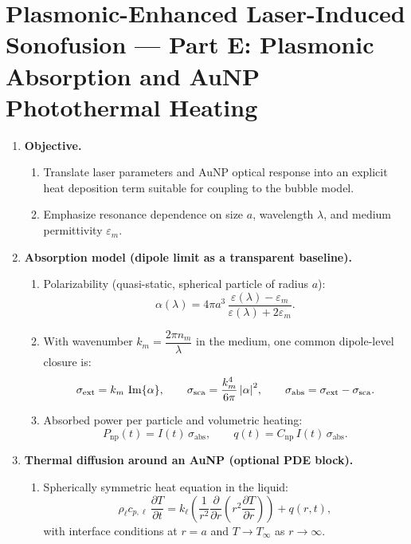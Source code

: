 \documentclass[11pt]{article}
\begin{document}
	\section{Plasmonic-Enhanced Laser-Induced Sonofusion --- Part E: Plasmonic Absorption and AuNP Photothermal Heating}
	\begin{enumerate}
		\item \textbf{Objective.}
		\begin{enumerate}
			\item Translate laser parameters and AuNP optical response into an explicit heat deposition term suitable for coupling to the bubble model.
			\item Emphasize resonance dependence on size $a$, wavelength $\lambda$, and medium permittivity $\varepsilon_m$.
		\end{enumerate}
		
		\item \textbf{Absorption model (dipole limit as a transparent baseline).}
		\begin{enumerate}
			\item Polarizability (quasi-static, spherical particle of radius $a$):
			\[
			\alpha(\lambda)=4\pi a^3\,\frac{\varepsilon(\lambda)-\varepsilon_m}{\varepsilon(\lambda)+2\varepsilon_m}.
			\]
			\item With wavenumber $k_m=\dfrac{2\pi n_m}{\lambda}$ in the medium, one common dipole-level closure is:
			\[
			\sigma_{\mathrm{ext}}=k_m\,\Im\{\alpha\},
			\qquad
			\sigma_{\mathrm{sca}}=\dfrac{k_m^4}{6\pi}\,\abs{\alpha}^2,
			\qquad
			\sigma_{\mathrm{abs}}=\sigma_{\mathrm{ext}}-\sigma_{\mathrm{sca}}.
			\]
			\item Absorbed power per particle and volumetric heating:
			\[
			P_{\mathrm{np}}(t)=I(t)\,\sigma_{\mathrm{abs}},
			\qquad
			q(t)=C_{\mathrm{np}}\,I(t)\,\sigma_{\mathrm{abs}}.
			\]
		\end{enumerate}
		
		\item \textbf{Thermal diffusion around an AuNP (optional PDE block).}
		\begin{enumerate}
			\item Spherically symmetric heat equation in the liquid:
			\[
			\rho_{\ell}c_{p,\ell}\,\frac{\partial T}{\partial t}
			=
			k_{\ell}\left(\frac{1}{r^2}\frac{\partial}{\partial r}\left(r^2\frac{\partial T}{\partial r}\right)\right)
			+ q(r,t),
			\]
			with interface conditions at $r=a$ and $T\to T_{\infty}$ as $r\to\infty$.
		\end{enumerate}
		

\end{enumerate}
\end{document}
